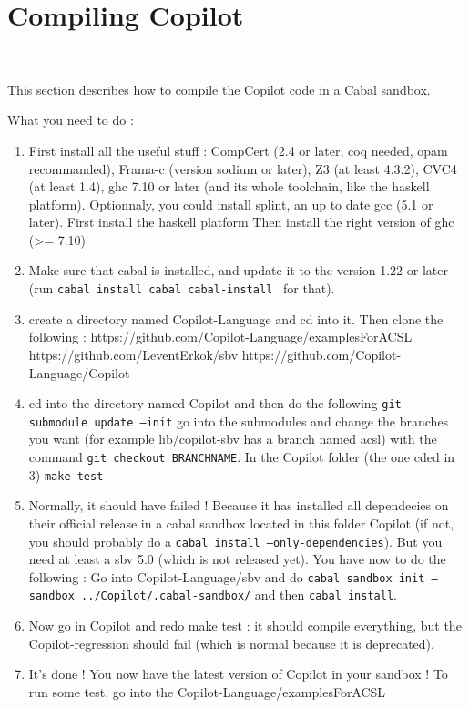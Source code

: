 \section{Compiling Copilot}~\label{sec:compile}

This section describes how to compile the Copilot code in a Cabal sandbox.

What you need to do : 
\begin{enumerate}
\item First install all the useful stuff : CompCert (2.4 or later, coq needed, opam recommanded), Frama-c (version sodium or later), Z3 (at least 4.3.2), CVC4 (at least 1.4), ghc 7.10 or later (and its whole toolchain, like the haskell platform).
\subitem Optionnaly, you could install splint, an up to date gcc (5.1 or later). 
\subitem First install the haskell platform
\subitem Then install the right version of ghc (>= 7.10)
\item Make sure that cabal is installed, and update it to the version 1.22 or later (run \texttt{cabal install cabal cabal-install } for that). 
\item create a directory named Copilot-Language and cd into it. Then clone the following :
\subitem https://github.com/Copilot-Language/examplesForACSL
\subitem https://github.com/LeventErkok/sbv
\subitem https://github.com/Copilot-Language/Copilot
\item cd into the directory named Copilot and then do the following
\subitem \texttt{git submodule update --init}
\subitem go into the submodules and change the branches you want (for example lib/copilot-sbv has a branch named acsl) with the command \texttt{git checkout BRANCHNAME}. 
\subitem In the Copilot folder (the one cded in 3) \texttt{make test}
\item Normally, it should have failed ! Because it has installed all dependecies on their official release in a cabal sandbox located in this folder Copilot (if not, you should probably do a \texttt{cabal install --only-dependencies}). But you need at least a sbv 5.0 (which is not released yet). You have now to do the following :
\subitem Go into Copilot-Language/sbv and do \texttt{cabal sandbox init --sandbox ../Copilot/.cabal-sandbox/} and then \texttt{cabal install}.
\item Now go in Copilot and redo make test : it should compile everything, but the Copilot-regression should fail (which is normal because it is deprecated).
\item It's done ! You now have the latest version of Copilot in your sandbox ! To run some test, go into the Copilot-Language/examplesForACSL
\end{enumerate}

